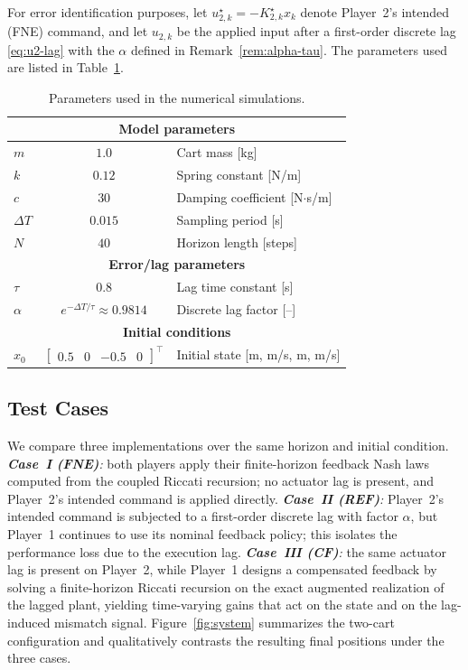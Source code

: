 \documentclass[letterpaper, 10 pt, conference]{ieeeconf}  %
\begin{document}
For error identification purposes, let $u_{2,k}^\star=-K_{2,k}^\star x_k$ denote Player~2’s intended (FNE) command, and let $u_{2,k}$ be the applied input after a first-order discrete lag \eqref{eq:u2-lag} with the $\alpha$ defined in Remark~\ref{rem:alpha-tau}. The parameters used are listed in Table~\ref{tab:params}.

\begin{table}[ht]
\centering
\caption{Parameters used in the numerical simulations.}
\begin{tabular}{lcl}
\hline
\multicolumn{3}{c}{\textbf{Model parameters}} \\
\hline
$m$       & $1.0$              & Cart mass [kg] \\
$k$       & $0.12$             & Spring constant [N/m] \\
$c$       & $30$               & Damping coefficient [N$\cdot$s/m] \\
$\Delta T$& $0.015$            & Sampling period [s] \\
$N$       & $40$               & Horizon length [steps] \\
\hline
\multicolumn{3}{c}{\textbf{Error/lag parameters}} \\
\hline
$\tau$    & $0.8$              & Lag time constant [s] \\
$\alpha$  & $e^{-\Delta T/\tau}\approx 0.9814$ & Discrete lag factor [–] \\
\hline
\multicolumn{3}{c}{\textbf{Initial conditions}} \\
\hline
$x_0$     & $\begin{bmatrix}0.5 & 0 & -0.5 & 0\end{bmatrix}^\top$
          & Initial state [m, m/s, m, m/s] \\
\hline
\end{tabular}
\label{tab:params}
\end{table}

\subsection*{Test Cases}
We compare three implementations over the same horizon and initial condition.
\emph{\textbf{Case~I (FNE)}:} both players apply their finite-horizon feedback Nash laws computed from the coupled Riccati recursion; no actuator lag is present, and Player~2’s intended command is applied directly.
\emph{\textbf{Case~II (REF)}:} Player~2’s intended command is subjected to a first-order discrete lag with factor $\alpha$, but Player~1 continues to use its nominal feedback policy; this isolates the performance loss due to the execution lag.
\emph{\textbf{Case~III (CF)}:} the same actuator lag is present on Player~2, while Player~1 designs a compensated feedback by solving a finite-horizon Riccati recursion on the exact augmented realization of the lagged plant, yielding time-varying gains that act on the state and on the lag-induced mismatch signal. Figure~\ref{fig:system} summarizes the two-cart configuration and qualitatively contrasts the resulting final positions under the three cases.
\end{document}
